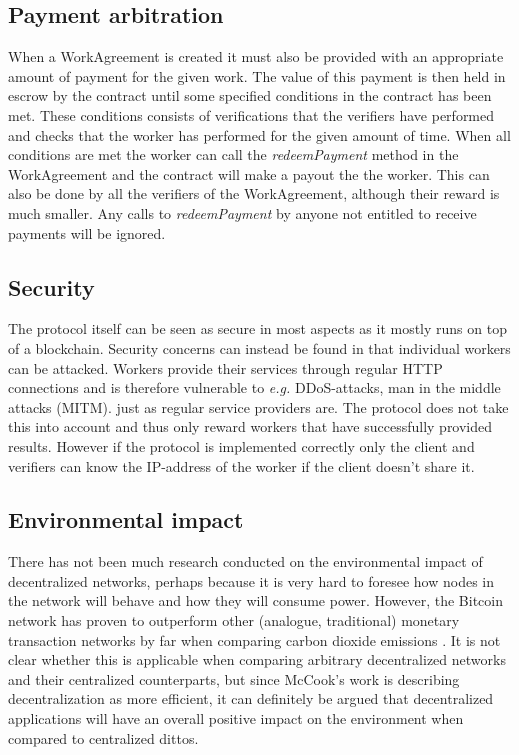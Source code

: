 \subsection{Payment arbitration}
When a WorkAgreement is created it must also be provided with an appropriate amount of payment for the given work. The value of this payment is then held in escrow by the contract until some specified conditions in the contract has been met. These conditions consists of verifications that the verifiers have performed and checks that the worker has performed for the given amount of time. When all conditions are met the worker can call the \textit{redeemPayment} method in the WorkAgreement and the contract will make a payout the the worker. This can also be done by all the verifiers of the WorkAgreement, although their reward is much smaller. Any calls to \textit{redeemPayment} by anyone not entitled to receive payments will be ignored.

\subsection{Security}
The protocol itself can be seen as secure in most aspects as it mostly runs on top of a blockchain. Security concerns can instead be found in that individual workers can be attacked. Workers provide their services through regular HTTP connections and is therefore vulnerable to \textit{e.g.} DDoS-attacks, man in the middle attacks (MITM). just as regular service providers are. The protocol does not take this into account and thus only reward workers that have successfully provided results. However if the protocol is implemented correctly only the client and verifiers can know the IP-address of the worker if the client doesn't share it.

\subsection{Environmental impact}
There has not been much research conducted on the environmental impact of decentralized networks, perhaps because it is very hard to foresee how nodes in the network will behave and how they will consume power. However, the Bitcoin network has proven to outperform other (analogue, traditional) monetary transaction networks by far when comparing carbon dioxide emissions \cite{cook}. It is not clear whether this is applicable when comparing arbitrary decentralized networks and their centralized counterparts, but since McCook's work is describing decentralization as more efficient, it can definitely be argued that decentralized applications will have an overall positive impact on the environment when compared to centralized dittos.

